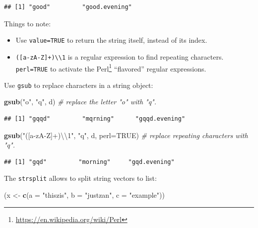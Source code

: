 \documentclass[]{book}
\newenvironment{Shaded}{\begin{snugshade}}{\end{snugshade}}
\newcommand{\CharTok}[1]{\textcolor[rgb]{0.31,0.60,0.02}{#1}}
\newcommand{\CommentTok}[1]{\textcolor[rgb]{0.56,0.35,0.01}{\textit{#1}}}
\newcommand{\DataTypeTok}[1]{\textcolor[rgb]{0.13,0.29,0.53}{#1}}
\newcommand{\KeywordTok}[1]{\textcolor[rgb]{0.13,0.29,0.53}{\textbf{#1}}}
\newcommand{\NormalTok}[1]{#1}
\newcommand{\OtherTok}[1]{\textcolor[rgb]{0.56,0.35,0.01}{#1}}
\newcommand{\StringTok}[1]{\textcolor[rgb]{0.31,0.60,0.02}{#1}}
\providecommand{\tightlist}{%
  \setlength{\itemsep}{0pt}\setlength{\parskip}{0pt}}
\renewcommand{\href}[2]{#2\footnote{\url{#1}}}
\theoremstyle{definition}
\theoremstyle{definition}
\theoremstyle{definition}
\theoremstyle{remark}
\begin{document}
\begin{verbatim}
## [1] "good"         "good.evening"
\end{verbatim}

Things to note:

\begin{itemize}
\tightlist
\item
  Use \texttt{value=TRUE} to return the string itself, instead of its index.
\item
  \texttt{({[}a-zA-Z{]}+)\textbackslash{}\textbackslash{}1} is a regular expression to find repeating characters. \texttt{perl=TRUE} to activate the \href{https://en.wikipedia.org/wiki/Perl}{Perl} ``flavored'' regular expressions.
\end{itemize}

Use \texttt{gsub} to replace characters in a string object:

\begin{Shaded}
\begin{Highlighting}[]
\KeywordTok{gsub}\NormalTok{(}\StringTok{"o"}\NormalTok{, }\StringTok{"q"}\NormalTok{, d) }\CommentTok{# replace the letter "o" with "q".}
\end{Highlighting}
\end{Shaded}

\begin{verbatim}
## [1] "gqqd"         "mqrning"      "gqqd.evening"
\end{verbatim}

\begin{Shaded}
\begin{Highlighting}[]
\KeywordTok{gsub}\NormalTok{(}\StringTok{"([a-zA-Z]+)}\CharTok{\textbackslash{}\textbackslash{}}\StringTok{1"}\NormalTok{, }\StringTok{"q"}\NormalTok{, d, }\DataTypeTok{perl=}\OtherTok{TRUE}\NormalTok{) }\CommentTok{# replace repeating characters with "q".}
\end{Highlighting}
\end{Shaded}

\begin{verbatim}
## [1] "gqd"         "morning"     "gqd.evening"
\end{verbatim}

The \texttt{strsplit} allows to split string vectors to list:

\begin{Shaded}
\begin{Highlighting}[]
\NormalTok{(x <-}\StringTok{ }\KeywordTok{c}\NormalTok{(}\DataTypeTok{a =} \StringTok{"thiszis"}\NormalTok{, }\DataTypeTok{b =} \StringTok{"justzan"}\NormalTok{, }\DataTypeTok{c =} \StringTok{"example"}\NormalTok{))}
\end{Highlighting}
\end{Shaded}
\end{document}
